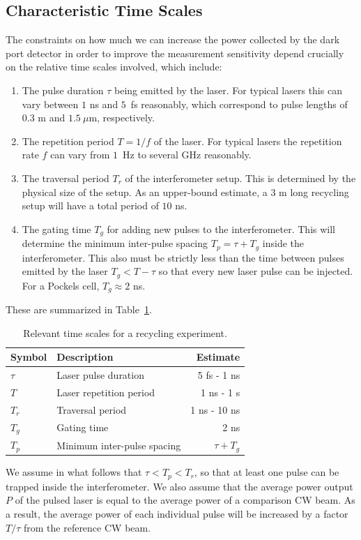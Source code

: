 \subsection{Characteristic Time Scales}
The constraints on how much we can increase the power collected by the dark port detector in order to improve the measurement sensitivity depend crucially on the relative time scales involved, which include:
\begin{enumerate}
  \item The pulse duration $\tau$ being emitted by the laser.  For typical lasers this can vary between $1$ ns and $5$~fs reasonably, which correspond to pulse lengths of $0.3$ m and $1.5~\mu$m, respectively.
  \item The repetition period $T = 1/f$ of the laser.  For typical lasers the repetition rate $f$ can vary from $1$~Hz to several GHz reasonably.
  \item The traversal period $T_r$ of the interferometer setup.  This is determined by the physical size of the setup.  As an upper-bound estimate, a $3$ m long recycling setup will have a total period of $10$ ns.
  \item The gating time $T_g$ for adding new pulses to the interferometer.  This will determine the minimum inter-pulse spacing $T_p = \tau + T_g$ inside the interferometer.  This also must be strictly less than the time between pulses emitted by the laser $T_g < T - \tau$ so that every new laser pulse can be injected.  For a Pockels cell, $T_g \approx 2$ ns.
\end{enumerate}
These are summarized in Table~\ref{tab:timescales}.

\begin{table}
  \centering
  \begin{tabular}{l | l r}
    Symbol \; & \; Description & Estimate \\
    \hline
    $\tau$ & \; Laser pulse duration & 5 fs - 1 ns \\
    $T$ & \; Laser repetition period & 1 ns - 1 s \\
    $T_r$ & \; Traversal period & 1 ns - 10 ns \\
    $T_g$ & \; Gating time & 2 ns \\
    $T_p$ & \; Minimum inter-pulse spacing & $\tau + T_g$
  \end{tabular}
  \caption{Relevant time scales for a recycling experiment.}
  \label{tab:timescales}
\end{table}

We assume in what follows that $\tau < T_p < T_r$, so that at least one pulse can be trapped inside the interferometer.  We also assume that the average power output $P$ of the pulsed laser is equal to the average power of a comparison CW beam.  As a result, the average power of each individual pulse will be increased by a factor $T/\tau$ from the reference CW beam.

